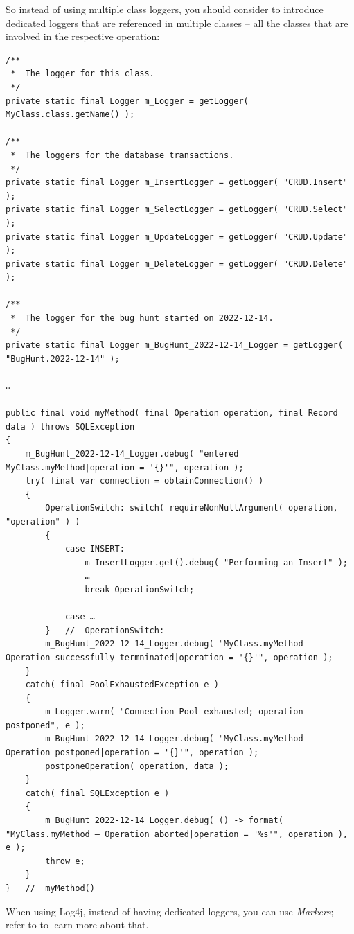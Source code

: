 \documentclass[11pt,a4paper, titlepage, parskip=half, headsepline, footsepline, cleardoublepage=current, headheight=1cm]{scrbook}
\begin{document}
So instead of using multiple class loggers, you should consider to introduce dedicated loggers that are referenced in multiple classes – all the classes that are involved in the respective operation:
\begin{lstlisting}
/**
 *  The logger for this class.
 */
private static final Logger m_Logger = getLogger( MyClass.class.getName() ); 

/**
 *  The loggers for the database transactions.
 */
private static final Logger m_InsertLogger = getLogger( "CRUD.Insert" );
private static final Logger m_SelectLogger = getLogger( "CRUD.Select" );
private static final Logger m_UpdateLogger = getLogger( "CRUD.Update" );
private static final Logger m_DeleteLogger = getLogger( "CRUD.Delete" );

/**
 *  The logger for the bug hunt started on 2022-12-14.
 */
private static final Logger m_BugHunt_2022-12-14_Logger = getLogger( "BugHunt.2022-12-14" ); 

…

public final void myMethod( final Operation operation, final Record data ) throws SQLException
{
    m_BugHunt_2022-12-14_Logger.debug( "entered MyClass.myMethod|operation = '{}'", operation );
    try( final var connection = obtainConnection() )
    {
        OperationSwitch: switch( requireNonNullArgument( operation, "operation" ) )
        {
            case INSERT:
                m_InsertLogger.get().debug( "Performing an Insert" );
                …
                break OperationSwitch;
                
            case …
        }   //  OperationSwitch:
        m_BugHunt_2022-12-14_Logger.debug( "MyClass.myMethod – Operation successfully termninated|operation = '{}'", operation );       
    }
    catch( final PoolExhaustedException e )
    {
        m_Logger.warn( "Connection Pool exhausted; operation postponed", e );
        m_BugHunt_2022-12-14_Logger.debug( "MyClass.myMethod – Operation postponed|operation = '{}'", operation );       
        postponeOperation( operation, data ); 
    }    
    catch( final SQLException e )
    {
        m_BugHunt_2022-12-14_Logger.debug( () -> format( "MyClass.myMethod – Operation aborted|operation = '%s'", operation ), e );
        throw e;
    }
}   //  myMethod() 
\end{lstlisting}

When using Log4j, instead of having dedicated loggers, you can use \textit{Markers}; refer to \autocite{APACHE_LOG4J:Markers} to learn more about that.
\end{document}
